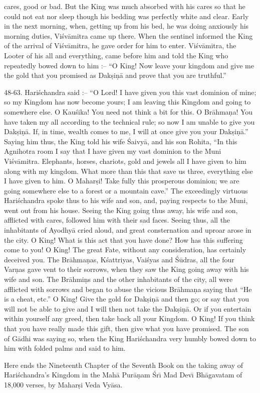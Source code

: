 cares, good or bad. But the King was much absorbed with his cares so that he could not eat nor sleep though his bedding was perfectly white and clear. Early in the next morning, when, getting up from his bed, he was doing anxiously his morning duties, Vi\'sv\=amitra came up there. When the sentinel informed the King of the arrival of Vi\'sv\=amitra, he gave order for him to enter. Vi\'sv\=amitra, the Looter of his all and everything, came before him and told the King who repeatedly bowed down to him :-- ``O King! Now leave your kingdom and give me the gold that you promised as Dak\d{s}i\d{n}\=a and prove that you are truthful.''

48-63. Hari\'schandra said :-- ``O Lord! I have given you this vast dominion of mine; so my Kingdom has now become yours; I am leaving this Kingdom and going to somewhere else. O Kau\'sika! You need not think a bit for this. O Br\=ahma\d{n}a! You have taken my all according to the technical rule; so now I am unable to give you Dak\d{s}i\d{n}\=a. If, in time, wealth comes to me, I will at once give you your Dak\d{s}i\d{n}\=a.'' Saying him thus, the King told his wife \'Saivy\=a, and his son Rohita, ``In this Agnihotra room I say that I have given my vast dominion to the Muni Vi\'sv\=amitra. Elephants, horses, chariots, gold and jewels all I have given to him along with my kingdom. What more than this that save us three, everything else I have given to him. O Mahar\d{s}i! Take fully this prosperous dominion; we are going somewhere else to a forest or a mountain cave.'' The exceedingly virtuous Hari\'schandra spoke thus to his wife and son, and, paying respects to the Muni, went out from his house. Seeing the King going thus away, his wife and son, afflicted with cares, followed him with their sad faces. Seeing thus, all the inhabitants of Ayodhy\=a cried aloud, and great consternation and uproar arose in the city. O King! What is this act that you have done? How has this suffering come to you! O King! The great Fate, without any consideration, has certainly deceived you. The Br\=ahma\d{n}as, K\'sattriyas, Vai\'syas and \'S\=udras, all the four Var\d{n}as gave vent to their sorrows, when they saw the King going away with his wife and son. The Br\=ahmi\d{n}s and the other inhabitants of the city, all were afflicted with sorrows and began to abuse the vicious Br\=ahma\d{n}a saying that ``He is a cheat, etc.'' O King! Give the gold for Dak\d{s}i\d{n}\=a and then go; or say that you will not be able to give and I will then not take the Dak\d{s}i\d{n}\=a. Or if you entertain within yourself any greed, then take back all your Kingdom. O King! If you think that you have really made this gift, then give what you have promised. The son of G\=adhi was saying so, when the King Hari\'schandra very humbly bowed down to him with folded palms and said to him.

Here ends the Nineteenth Chapter of the Seventh Book on the taking away of Hari\'schandra's Kingdom in the Mah\=a Pur\=a\d{n}am \'Sr\={\i} Mad Dev\={\i} Bh\=agavatam of 18,000 verses, by Mahar\d{s}i Veda Vy\=asa.



